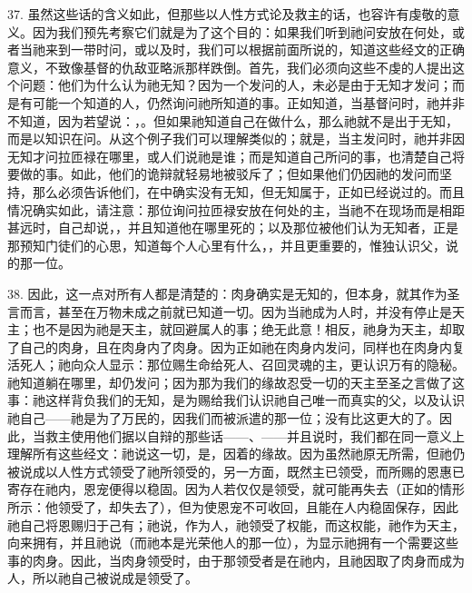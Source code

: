 37. 虽然这些话的含义如此，但那些以人性方式论及救主的话，也容许有虔敬的意义。因为我们预先考察它们就是为了这个目的：如果我们听到祂问安放在何处，或者当祂来到一带时问，或以及时，我们可以根据前面所说的，知道这些经文的正确意义，不致像基督的仇敌亚略派那样跌倒。首先，我们必须向这些不虔的人提出这个问题：他们为什么认为祂无知？因为一个发问的人，未必是由于无知才发问；而是有可能一个知道的人，仍然询问祂所知道的事。正如知道，当基督问时，祂并非不知道，因为若望说：，。但如果祂知道自己在做什么，那么祂就不是出于无知，而是以知识在问。从这个例子我们可以理解类似的；就是，当主发问时，祂并非因无知才问拉匝禄在哪里，或人们说祂是谁；而是知道自己所问的事，也清楚自己将要做的事。如此，他们的诡辩就轻易地被驳斥了；但如果他们仍因祂的发问而坚持，那么必须告诉他们，在中确实没有无知，但无知属于，正如已经说过的。而且情况确实如此，请注意：那位询问拉匝禄安放在何处的主，当祂不在现场而是相距甚远时，自己却说，，并且知道他在哪里死的；以及那位被他们认为无知者，正是那预知门徒们的心思，知道每个人心里有什么，，并且更重要的，惟独认识父，说的那一位。\par

38. 因此，这一点对所有人都是清楚的：肉身确实是无知的，但本身，就其作为圣言而言，甚至在万物未成之前就已知道一切。因为当祂成为人时，并没有停止是天主；也不是因为祂是天主，就回避属人的事；绝无此意！相反，祂身为天主，却取了自己的肉身，且在肉身内了肉身。因为正如祂在肉身内发问，同样也在肉身内复活死人；祂向众人显示：那位赐生命给死人、召回灵魂的主，更认识万有的隐秘。祂知道躺在哪里，却仍发问；因为那为我们的缘故忍受一切的天主至圣之言做了这事：祂这样背负我们的无知，是为赐给我们认识祂自己唯一而真实的父，以及认识祂自己——祂是为了万民的，因我们而被派遣的那一位；没有比这更大的了。因此，当救主使用他们据以自辩的那些话——、——并且说时，我们都在同一意义上理解所有这些经文：祂说这一切，是，因着的缘故。因为虽然祂原无所需，但祂仍被说成以人性方式领受了祂所领受的，另一方面，既然主已领受，而所赐的恩惠已寄存在祂内，恩宠便得以稳固。因为人若仅仅是领受，就可能再失去（正如的情形所示：他领受了，却失去了），但为使恩宠不可收回，且能在人内稳固保存，因此祂自己将恩赐归于己有；祂说，作为人，祂领受了权能，而这权能，祂作为天主，向来拥有，并且祂说（而祂本是光荣他人的那一位），为显示祂拥有一个需要这些事的肉身。因此，当肉身领受时，由于那领受者是在祂内，且祂因取了肉身而成为人，所以祂自己被说成是领受了。\par

